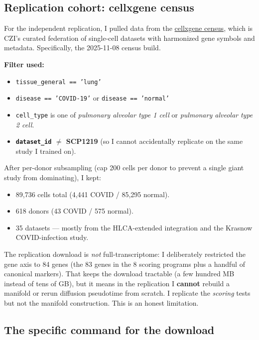 \documentclass[11pt]{article}
\begin{document}
\subsection{Replication cohort: cellxgene census}

For the independent replication, I pulled data from the
\href{https://cellxgene.cziscience.com/docs/04__Census/}{cellxgene census},
which is CZI's curated federation of single-cell datasets with harmonized
gene symbols and metadata. Specifically, the 2025-11-08 census build.

\textbf{Filter used:}
\begin{itemize}
\item \texttt{tissue\_general == 'lung'}
\item \texttt{disease == 'COVID-19'} or \texttt{disease == 'normal'}
\item \texttt{cell\_type} is one of \emph{pulmonary alveolar type 1 cell} or
      \emph{pulmonary alveolar type 2 cell}.
\item \textbf{\texttt{dataset\_id} $\neq$ SCP1219} (so I cannot accidentally
      replicate on the same study I trained on).
\end{itemize}

After per-donor subsampling (cap 200 cells per donor to prevent a single
giant study from dominating), I kept:
\begin{itemize}
\item 89{,}736 cells total (4{,}441 COVID / 85{,}295 normal).
\item 618 donors (43 COVID / 575 normal).
\item 35 datasets --- mostly from the HLCA-extended integration and the Krasnow
      COVID-infection study.
\end{itemize}

\begin{pitfall}
The replication download is \emph{not} full-transcriptome: I deliberately
restricted the gene axis to 84 genes (the 83 genes in the 8 scoring programs
plus a handful of canonical markers). That keeps the download tractable
(a few hundred MB instead of tens of GB), but it means in the replication I
\textbf{cannot} rebuild a manifold or rerun diffusion pseudotime from
scratch. I replicate the \emph{scoring} tests but not the manifold construction.
This is an honest limitation.
\end{pitfall}

\subsection{The specific command for the download}
\end{document}
